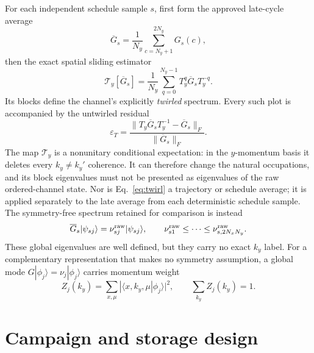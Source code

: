 \documentclass[aps,prb,twocolumn,nofootinbib,superscriptaddress,floatfix]{revtex4-2}
\begin{document}
For each independent schedule sample $s$, first form the approved late-cycle average
\begin{equation}
 \overline G_s=\frac1{N_y}\sum_{c=N_y+1}^{2N_y}G_s(c),
 \label{eq:timeaverage}
\end{equation}
then the exact spatial sliding estimator
\begin{equation}
 \mathcal T_y[\overline G_s]
 =\frac1{N_y}\sum_{q=0}^{N_y-1}T_y^q\overline G_sT_y^{-q}.
 \label{eq:twirl}
\end{equation}
Its blocks define the channel's explicitly \emph{twirled} spectrum.  Every such plot is
accompanied by the untwirled residual
\begin{equation}
 \varepsilon_T=\frac{\|T_y\overline G_sT_y^{-1}-\overline G_s\|_F}
 {\|\overline G_s\|_F}.
 \label{eq:translationresidual}
\end{equation}
The map $\mathcal T_y$ is a nonunitary conditional expectation: in the $y$-momentum
basis it deletes every $k_y\ne k_y'$ coherence.  It can therefore change the natural
occupations, and its block eigenvalues must not be presented as eigenvalues of the raw
ordered-channel state.  Nor is Eq.~\eqref{eq:twirl} a trajectory or schedule average;
it is applied separately to the late average from each deterministic schedule sample.
The symmetry-free spectrum retained for comparison is instead
\begin{equation}
 \overline G_s|\psi_{sj}\rangle=\nu^{\rm raw}_{sj}|\psi_{sj}\rangle,
 \qquad
 \nu^{\rm raw}_{s1}\le\cdots\le\nu^{\rm raw}_{s,2N_xN_y}.
 \label{eq:rawspectrum}
\end{equation}
These global eigenvalues are well defined, but they carry no exact $k_y$ label.
For a complementary representation that makes no symmetry assumption, a global mode
$G|\phi_j\rangle=\nu_j|\phi_j\rangle$ carries momentum weight
\begin{equation}
 Z_j(k_y)=\sum_{x,\mu}|\langle x,k_y,\mu|\phi_j\rangle|^2,
 \qquad \sum_{k_y}Z_j(k_y)=1.
 \label{eq:momentumweight}
\end{equation}

\section{Campaign and storage design}
\end{document}

